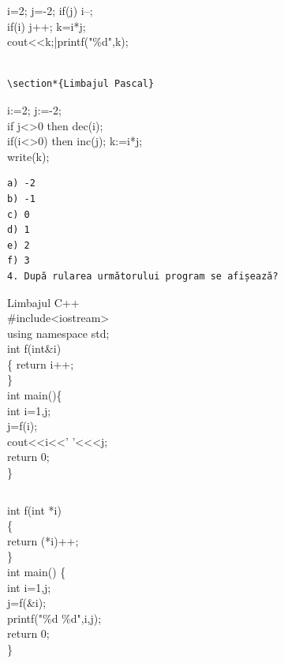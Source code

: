 \documentclass[10pt]{article}
\begin{document}
\begin{verbatim}

\end{verbatim}

i=2; j=-2; if(j) i--;\\
if(i) j++; k=i*j;\\
cout<<k;|printf("\%d",k);

\begin{verbatim}

\section*{Limbajul Pascal}
\end{verbatim}

i:=2; j:=-2;\\
if j<>0 then dec(i);\\
if(i<>0) then inc(j); k:=i*j;\\
write(k);

\begin{verbatim}
a) -2
b) -1
c) 0
d) 1
e) 2
f) 3
4. După rularea următorului program se afișează?
\end{verbatim}

Limbajul C++\\
\#include<iostream>\\
using namespace std;\\
int f(int\&i)\\
\{ return i++;\\
\}\\
int main()\{\\
int i=1,j;\\
j=f(i);\\
cout<<i<<' '<<<j;\\
return 0;\\
\}

\begin{verbatim}

\end{verbatim}

int f(int *i)\\
\{\\
return (*i)++;\\
\}\\
int main() \{\\
int i=1,j;\\
j=f(\&i);\\
printf("\%d \%d",i,j);\\
return 0;\\
\}
\end{document}
